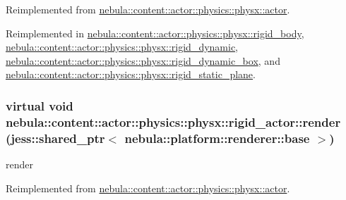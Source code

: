 Reimplemented from \hyperlink{classnebula_1_1content_1_1actor_1_1physics_1_1physx_1_1actor_a2eb5926a96bcef37981ad9fcb55d35e4}{nebula::content::actor::physics::physx::actor}.

Reimplemented in \hyperlink{classnebula_1_1content_1_1actor_1_1physics_1_1physx_1_1rigid__body_af787176f75d680ab3ca2ad56ac64484e}{nebula::content::actor::physics::physx::rigid\_\-body}, \hyperlink{classnebula_1_1content_1_1actor_1_1physics_1_1physx_1_1rigid__dynamic_a956e5d0fadb4b75aa03e99991c84c445}{nebula::content::actor::physics::physx::rigid\_\-dynamic}, \hyperlink{classnebula_1_1content_1_1actor_1_1physics_1_1physx_1_1rigid__dynamic__box_a46578408f7f93646a86924261dbb8442}{nebula::content::actor::physics::physx::rigid\_\-dynamic\_\-box}, and \hyperlink{classnebula_1_1content_1_1actor_1_1physics_1_1physx_1_1rigid__static__plane_a16d2723283f762b1046631cec801f211}{nebula::content::actor::physics::physx::rigid\_\-static\_\-plane}.\hypertarget{classnebula_1_1content_1_1actor_1_1physics_1_1physx_1_1rigid__actor_a0d7cabcd9cf67f5204e3ec2633e81641}{
\subsubsection[{render}]{\setlength{\rightskip}{0pt plus 5cm}virtual void nebula::content::actor::physics::physx::rigid\_\-actor::render (jess::shared\_\-ptr$<$ {\bf nebula::platform::renderer::base} $>$)}}
\label{classnebula_1_1content_1_1actor_1_1physics_1_1physx_1_1rigid__actor_a0d7cabcd9cf67f5204e3ec2633e81641}


render 

Reimplemented from \hyperlink{classnebula_1_1content_1_1actor_1_1physics_1_1physx_1_1actor_aafea4a02068b40761e03c2a616971563}{nebula::content::actor::physics::physx::actor}.

